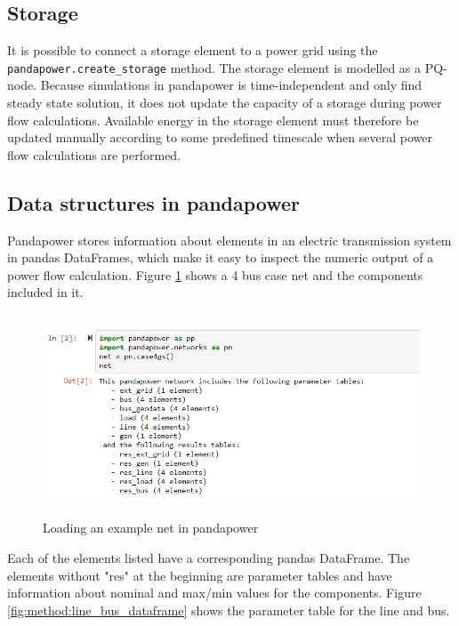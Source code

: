 \documentclass[class=book, crop=false, 11pt]{standalone}
\begin{document}
\subsection*{Storage}
It is possible to connect a storage element to a power grid using the \texttt{pandapower.create\_storage} method. The storage element is modelled as a PQ-node. Because simulations in pandapower is time-independent and only find steady state solution, it does not update the capacity of a storage during power flow calculations. Available energy in the storage element must therefore be updated manually according to some predefined timescale when several power flow calculations are performed.  


\subsection{Data structures in pandapower}

Pandapower stores information about elements in an electric transmission system in pandas DataFrames, which make it easy to inspect the numeric output of a power flow calculation. Figure \ref{fig:method:loading_example_net} shows a 4 bus case net and the components included in it. 

\begin{figure}[H]
    \center
    \includegraphics[height=6cm, width=12cm]{figures/case4g_show_net.PNG}
    \caption[size = 9]{Loading an example net in pandapower}
    \label{fig:method:loading_example_net}
\end{figure}
Each of the elements listed have a corresponding pandas DataFrame. The elements without "res" at the beginning are parameter tables and have information about nominal and max/min values for the components. Figure \ref{fig:method:line_bus_dataframe} shows the parameter table for the line and bus.
\end{document}
